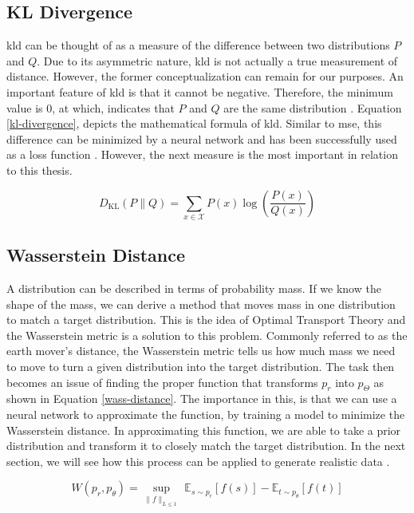 \subsection{KL Divergence}
\acrfull{kld}\cite{kullback1951} can be thought of as a measure of the difference between two distributions $P$ and $Q$. Due to its asymmetric nature, \acrshort{kld} is not actually a true measurement of distance. However, the former conceptualization can remain for our purposes. An important feature of \acrshort{kld} is that it cannot be negative. Therefore, the minimum value is 0, at which, indicates that $P$ and $Q$ are the same distribution . Equation \ref{kl-divergence}, depicts the mathematical formula of \acrshort{kld}. Similar to \acrshort{mse}, this difference can be minimized by a neural network and has been successfully used as a loss function \cite{Goodfellow-et-al-2016}. However, the next measure is the most important in relation to this thesis. 
\begin{center}
    \begin{equation}
    \label{kl-divergence}
       D_{\text{KL}}(P\parallel Q)=\sum _{x\in {\mathcal {X}}}P(x)\log \left({\frac {P(x)}{Q(x)}}\right)
    \end{equation}
\end{center}

\subsection{Wasserstein Distance}
A distribution can be described in terms of probability mass. If we know the shape of the mass, we can derive a method that moves mass in one distribution to match a target distribution. This is the idea of Optimal Transport Theory  and the Wasserstein metric is a solution to this problem. Commonly referred to as the earth mover's distance, the Wasserstein metric tells us how much mass we need to move to turn a given distribution into the target distribution. The task then becomes an issue of finding the proper function that transforms $p_r$ into $p_\Theta$ as shown in Equation \ref{wass-distance}. The importance in this, is that we can use a neural network to approximate the function, by training a model to minimize the Wasserstein distance. In approximating this function, we are able to take a prior distribution and transform it to closely match the target distribution. In the next section, we will see how this process can be applied to generate realistic data \cite{optimal-transport}.
\begin{center}
    \begin{equation}
    \label{wass-distance}
W(p_r, p_\theta) = \sup_{\lVert f \lVert_{L \leq 1}} \ \mathbb{E}_{s \sim p_r}[f(s)] - \mathbb{E}_{t \sim p_\theta}[f(t)]
    \end{equation}
\end{center}



